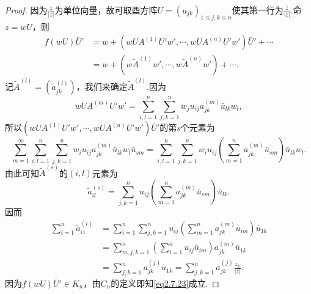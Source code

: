 \begin{proof}
	因为$\frac{z}{|z|}$为单位向量，故可取酉方阵$U=(u_{jk})_{1\le j,k\le n}$使其第一行为$\frac{\bar{z}}{|z|}$.命$z=wU$，则
	\begin{align*}
		f(wU)\bar{U}'
		&=w+(wUA^{(1)}U'w',\cdots,wUA^{(n)}U'w')\bar{U}'+\cdots\\
		&=w+(w\tilde{A}^{(1)}w',\cdots,w\tilde{A}^{(n)}w')+\cdots.
	\end{align*}
记$\tilde{A}^{(l)}=(\tilde{a}_{jk}^{(l)})$，我们来确定$\tilde{A}^{(l)}$.因为
\[wUA^{(m)}U'w'=\sum_{i,l=1}^{n}\sum_{j,k=1}^{n}w_j u_{ij}a_{jk}^{(m)}\bar{u}_{lk}w_l,\]
所以$(wUA^{(1)}U'w',\cdots,wUA^{(n)}U'w')\bar{U}'$的第$s$个元素为
\[\sum_{m=1}^{\infty}\sum_{i,l=1}^{n}\sum_{j,k=1}^{n}w_i u_{ij}a_{jk}^{(m)}\bar{u}_{lk}w_l\bar{u}_{sm}=\sum_{i,l=1}^{n}\sum_{j,k=1}^{n}w_iu_{ij}\left(\sum_{m=1}^{n}a_{jk}^{(m)}\bar{u}_{sm}\right)\bar{u}_{lk}w_l.\]
由此可知$\tilde{A}^{(s)}$的$(i,l)$元素为
\[\tilde{a}_{il}^{(s)}=\sum_{j,k=1}^{n}u_{ij}\left(\sum_{m=1}^{n}a_{jk}^{(m)}\bar{u}_{sm}\right)\bar{u}_{lk}.\]
因而
\begin{align*}
	\sum_{i=1}^{n}\tilde{a}_{i1}^{(i)}
	&=\sum_{i=1}^{n}\sum_{j,k=1}^{n}u_{ij}\left(\sum_{m=1}^{n}a_{jk}^{(m)}\bar{u}_{im}\right)\bar{u}_{1k}\\
	&=\sum_{m,j,k=1}^{n}\left(\sum_{i=1}^{n}u_{ij}\bar{u}_{im}\right)a_{jk}^{(m)}\bar{u}_{1k}\\
	&=\sum_{j,k=1}^{n}a_{jk}^{(j)}\bar{u}_{1k}=\sum_{j,k=1}^{n}a_{jk}^{(j)}\frac{z_k}{|z|}.
\end{align*}
因为$f(wU)\bar{U}'\in K_n$，由$C_n$的定义即知\eqref{eq2.7.23}成立.
\end{proof}
